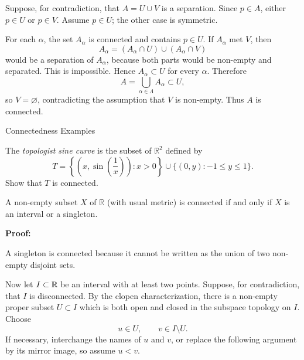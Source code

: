 \documentclass[12pt, a4paper]{article}
\begin{document}
Suppose, for contradiction, that \(A=U\cup V\) is a separation.  Since \(p\in A\), either \(p\in U\) or \(p\in V\).  Assume \(p\in U\); the other case is symmetric.

For each \(\alpha\), the set \(A_{\alpha}\) is connected and contains \(p\in U\).  If \(A_{\alpha}\) met \(V\), then
\[
A_{\alpha}=(A_{\alpha}\cap U)\cup(A_{\alpha}\cap V)
\]
would be a separation of \(A_{\alpha}\), because both parts would be non-empty and separated.  This is impossible.  Hence \(A_{\alpha}\subset U\) for every \(\alpha\).  Therefore
\[
A=\bigcup_{\alpha\in\Lambda}A_{\alpha}\subset U,
\]
so \(V=\varnothing\), contradicting the assumption that \(V\) is non-empty.  Thus \(A\) is connected.

\clearpage

\begin{heading}
    Connectedness Examples
\end{heading}

\vspace{10pt}

\begin{problem}
    The \textit{topologist sine curve} is the subset of \(\mathbb{R}^2\) defined by
    \[
        T = \left\{ \left(x, \sin\left(\frac{1}{x}\right)\right) : x > 0 \right\} \cup \{(0, y) : -1 \leq y \leq 1\}.
    \]
    Show that \(T\) is connected.
\end{problem}

\clearpage

\begin{theorem}
    A non-empty subset $X$ of \(\mathbb{R}\) (with usual metric) is connected if and only if $X$ is an interval or a singleton.
\end{theorem}

\vspace{10pt}

\textbf{Proof:}

A singleton is connected because it cannot be written as the union of two non-empty disjoint sets.

Now let \(I\subset\mathbb{R}\) be an interval with at least two points.  Suppose, for contradiction, that \(I\) is disconnected.  By the clopen characterization, there is a non-empty proper subset \(U\subset I\) which is both open and closed in the subspace topology on \(I\).  Choose
\[
u\in U,
\qquad
v\in I\setminus U.
\]
If necessary, interchange the names of \(u\) and \(v\), or replace the following argument by its mirror image, so assume \(u<v\).
\end{document}
